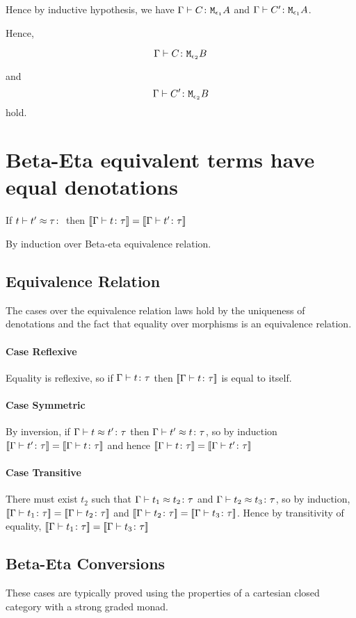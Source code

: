 {Hence by inductive hypothesis, we have $\Gamma \vdash C \colon \texttt{M}_{\epsilon_1}{A}$ and $\Gamma \vdash C' \colon \texttt{M}_{\epsilon_1}{A}$.

Hence,

\begin{equation}
    \Gamma \vdash C \colon \texttt{M}_{\epsilon_2}{B}
\end{equation}

and 
\begin{equation}
    \Gamma \vdash C' \colon \texttt{M}_{\epsilon_2}{B}
\end{equation}
hold. 


\section{Beta-Eta equivalent terms have equal denotations}
If $\berelation{t}{t'}{\tau}$ then ${\bf [\![}\Gamma \vdash t \colon \tau{\bf ]\!]} = {\bf [\![}\Gamma \vdash t' \colon \tau{\bf ]\!]}$

By induction over Beta-eta equivalence relation.
\subsection{Equivalence Relation}
The cases over the equivalence relation laws hold by the uniqueness of denotations and the fact that equality over morphisms is an equivalence relation.
\paragraph{Case Reflexive}
Equality is reflexive, so if $\Gamma \vdash t \colon \tau$ then ${\bf [\![}\Gamma \vdash t \colon \tau{\bf ]\!]}$ is equal to itself.
\paragraph{Case Symmetric}
By inversion, if $\Gamma \vdash t \approx t' \colon \tau$ then $\Gamma \vdash t' \approx t \colon \tau$, so by induction ${\bf [\![}\Gamma \vdash t' \colon \tau{\bf ]\!]} = {\bf [\![}\Gamma \vdash t \colon \tau{\bf ]\!]}$ and hence ${\bf [\![}\Gamma \vdash t \colon \tau{\bf ]\!]} = {\bf [\![}\Gamma \vdash t' \colon \tau{\bf ]\!]}$
\paragraph{Case Transitive}
There must exist $t_2$ such that $\Gamma \vdash t_1 \approx t_2 \colon \tau$ and $\Gamma \vdash t_2 \approx t_3 \colon \tau$, so by induction,
${\bf [\![}\Gamma \vdash t_1 \colon \tau{\bf ]\!]} = {\bf [\![}\Gamma \vdash t_2 \colon \tau{\bf ]\!]}$ and ${\bf [\![}\Gamma \vdash t_2 \colon \tau{\bf ]\!]} = {\bf [\![}\Gamma \vdash t_3 \colon \tau{\bf ]\!]}$. Hence by transitivity of equality, ${\bf [\![}\Gamma \vdash t_1 \colon \tau{\bf ]\!]} = {\bf [\![}\Gamma \vdash t_3 \colon \tau{\bf ]\!]}$

\subsection{Beta-Eta Conversions}
These cases are typically proved using the properties of a cartesian closed category with a strong graded monad.

}
